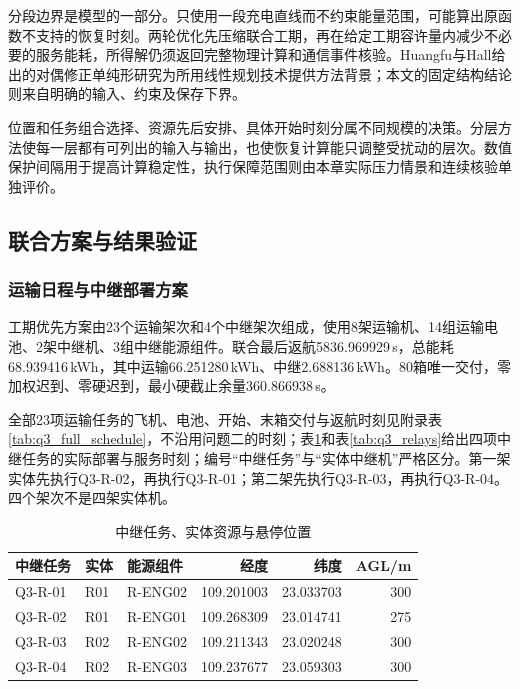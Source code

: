 \documentclass[withoutpreface,colorprint]{format}
\numberwithin{equation}{section}
\numberwithin{figure}{section}
\numberwithin{table}{section}
\begin{document}
分段边界是模型的一部分。只使用一段充电直线而不约束能量范围，可能算出原函数不支持的恢复时刻。两轮优化先压缩联合工期，再在给定工期容许量内减少不必要的服务能耗，所得解仍须返回完整物理计算和通信事件核验。Huangfu与Hall给出的对偶修正单纯形研究为所用线性规划技术提供方法背景\cite{huangfu2018}；本文的固定结构结论则来自明确的输入、约束及保存下界。

位置和任务组合选择、资源先后安排、具体开始时刻分属不同规模的决策。分层方法使每一层都有可列出的输入与输出，也使恢复计算能只调整受扰动的层次。数值保护间隔用于提高计算稳定性，执行保障范围则由本章实际压力情景和连续核验单独评价。


\subsection{联合方案与结果验证}
\subsubsection{运输日程与中继部署方案}
工期优先方案由23个运输架次和4个中继架次组成，使用8架运输机、14组运输电池、2架中继机、3组中继能源组件。联合最后返航5836.969929\,s，总能耗68.939416\,kWh，其中运输66.251280\,kWh、中继2.688136\,kWh。80箱唯一交付，零加权迟到、零硬迟到，最小硬截止余量360.866938\,s。

全部23项运输任务的飞机、电池、开始、末箱交付与返航时刻见附录表\ref{tab:q3_full_schedule}，不沿用问题二的时刻；表\ref{tab:q3_sites}和表\ref{tab:q3_relays}给出四项中继任务的实际部署与服务时刻；编号“中继任务”与“实体中继机”严格区分。第一架实体先执行Q3-R-02，再执行Q3-R-01；第二架先执行Q3-R-03，再执行Q3-R-04。四个架次不是四架实体机。

\begin{table}[htbp]\centering\small
\caption{中继任务、实体资源与悬停位置}\label{tab:q3_sites}
\begin{tabular}{@{}lllrrr@{}}
\toprule
中继任务 & 实体 & 能源组件 & 经度 & 纬度 & AGL/m\\
\midrule
Q3-R-01 & R01 & R-ENG02 & 109.201003 & 23.033703 & 300\\
Q3-R-02 & R01 & R-ENG01 & 109.268309 & 23.014741 & 275\\
Q3-R-03 & R02 & R-ENG02 & 109.211343 & 23.020248 & 300\\
Q3-R-04 & R02 & R-ENG03 & 109.237677 & 23.059303 & 300\\
\bottomrule
\end{tabular}
\end{table}
\end{document}
